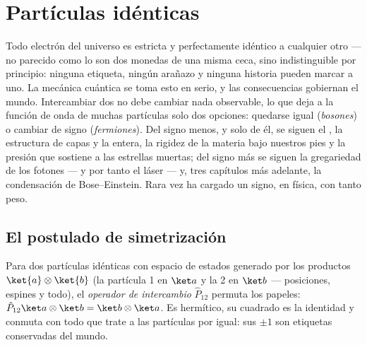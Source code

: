\chapter{Partículas idénticas}\label{ch:b3:identical-particles}

Todo electrón del universo es estricta y perfectamente idéntico a
cualquier otro --- no parecido como lo son dos monedas de una misma ceca,
sino indistinguible por principio: ninguna etiqueta, ningún arañazo y
ninguna historia pueden marcar a uno. La mecánica cuántica se toma esto en
serio, y las consecuencias gobiernan el mundo. Intercambiar dos  no debe cambiar nada observable, lo que deja a la función de onda
de muchas partículas solo dos opciones: quedarse igual (\emph{bosones}) o
cambiar de signo (\emph{fermiones}). Del signo menos, y solo de él, se
siguen el , la estructura de capas y la  entera, la rigidez de la materia bajo nuestros pies y la presión
que sostiene a las estrellas muertas; del signo más se siguen la gregariedad
de los fotones --- y por tanto el láser --- y, tres capítulos más adelante,
la condensación de Bose--Einstein. Rara vez ha cargado un signo, en física,
con tanto peso.

\section{El postulado de simetrización}

\begin{definition}[Intercambio]\label{def:b3:identical-particles:exchange}
Para dos partículas idénticas con espacio de estados generado por los
productos $\ket{a}\otimes\ket{b}$ (la partícula 1 en $\ket a$ y la 2 en
$\ket b$ --- posiciones, espines y todo), el \emph{operador de intercambio}
$\hat P_{12}$ permuta los papeles: $\hat P_{12}\ket a\otimes\ket b =
\ket b\otimes\ket a$. Es hermítico, su cuadrado es la identidad y
conmuta con todo  que trate a las partículas por igual:
sus  $\pm1$ son etiquetas conservadas del mundo.
\end{definition}

